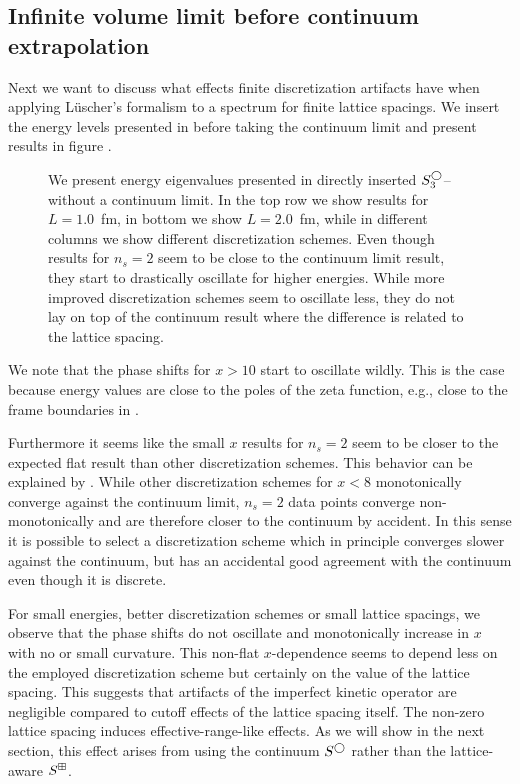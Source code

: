 \subsection{Infinite volume limit before continuum extrapolation}
Next we want to discuss what effects finite discretization artifacts have when applying L\"uscher's formalism to a spectrum for finite lattice spacings.
We insert the energy levels presented in  before taking the continuum limit and present results in figure .

\begin{figure}[th]
    \scalebox{0.9}{}
    \caption{
        \label{fig:unimproved spherical}
        We present energy eigenvalues presented in  directly inserted $S^{\bigcirc}_3$--without a continuum limit.
        In the top row we show results for $L=1.0$~fm, in bottom we show $L=2.0$~fm, while in different columns we show different discretization schemes.
        Even though results for $n_s = 2$ seem to be close to the continuum limit result, they start to drastically oscillate for higher energies.
        While more improved discretization schemes seem to oscillate less, they do not lay on top of the continuum result where the difference is related to the lattice spacing.
    }
\end{figure}

We note that the phase shifts for $x > 10$ start to oscillate wildly.
This is the case because energy values are close to the poles of the zeta function, e.g., close to the frame boundaries in .

Furthermore it seems like the small $x$ results for $n_s = 2$ seem to be closer to the expected flat result than other discretization schemes.
This behavior can be explained by .
While other discretization schemes for $x < 8$ monotonically converge against the continuum limit, $n_s = 2$ data points converge non-monotonically and are therefore closer to the continuum by accident.
In this sense it is possible to select a discretization scheme which in principle converges slower against the continuum, but has an accidental good agreement with the continuum even though it is discrete.

For small energies, better discretization schemes or small lattice spacings, we observe that the phase shifts do not oscillate and monotonically increase in $x$ with no or small curvature.
This non-flat $x$-dependence seems to depend less on the employed discretization scheme but certainly on the value of the lattice spacing.
This suggests that artifacts of the imperfect kinetic operator are negligible compared to cutoff effects of the lattice spacing itself.
The non-zero lattice spacing induces effective-range-like effects.
As we will show in the next section, this effect arises from using the continuum $S^{\bigcirc}$ rather than the lattice-aware $S^{\boxplus}$.

